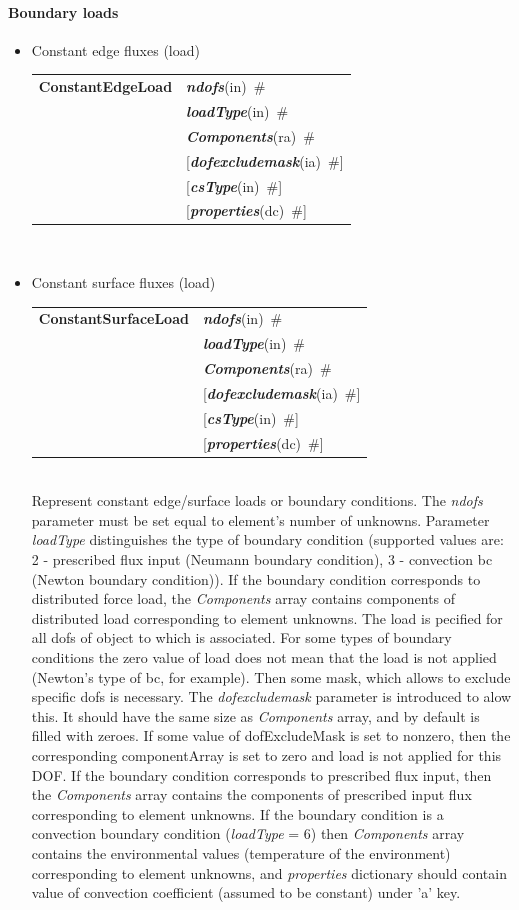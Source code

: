 \documentclass[a4paper]{article}
\makeatletter
\newcommand{\param}[1]{{\em #1}}
\newcommand{\keywordnotype}[1]{\mbox{{\it{\bf{#1}}}}}
\newcommand{\keyword}[2]{\mbox{{\keywordnotype{#1}\tiny (#2)}}}
\newcommand{\entKeywordInst}[1]{\mbox{{\bf{{#1}}}}}
\newcommand{\field}[2]{\mbox{\keyword{#1}{#2}~\#}}
\newcommand{\optField}[2]{\mbox{[\field{#1}{#2}]}}
\newenvironment{record}[1][]{\begin{tabular}{|ll}}{\end{tabular}\\}
\newcommand{\recentry}[2]{{#1}&{#2}\\}
\newcounter{rcc}
\newenvironment{record}[1][\textwidth]{\setcounter{rcc}{0}\begin{tabular*}{#1}{|ll@{\extracolsep{\fill}}r}}{\end{tabular*}\\}
\newcommand{\recentry}[2]{\ifthenelse{\value{rcc}>0}{&$\backslash$ \\}{\setcounter{rcc}{1}}{#1}&{#2}}
\makeatother
\begin{document}
\paragraph{Boundary loads}
\begin{itemize}
\item Constant edge fluxes (load)

  \begin{record}[0.9\textwidth]
    \recentry{\entKeywordInst{ConstantEdgeLoad}}{\field{ndofs}{in}} \recentry{}{\field{loadType}{in}}
    \recentry{}{\field{Components}{ra}} \recentry{}{\optField{dofexcludemask}{ia}} 
    \recentry{}{\optField{csType}{in}} \recentry{}{\optField{properties}{dc}}
  \end{record}
\item Constant surface fluxes (load)

  \begin{record}[0.9\textwidth]
    \recentry{\entKeywordInst{ConstantSurfaceLoad}}{\field{ndofs}{in}} \recentry{}{\field{loadType}{in}}
    \recentry{}{\field{Components}{ra}} \recentry{}{\optField{dofexcludemask}{ia}} 
    \recentry{}{\optField{csType}{in}} \recentry{}{\optField{properties}{dc}}
  \end{record}
  Represent constant edge/surface loads or boundary conditions. The \param{ndofs} parameter must be set
equal to element's number of unknowns. Parameter \param{loadType}
distinguishes the type of boundary condition (supported values are:
2 - prescribed flux input (Neumann boundary condition), 3 - convection bc (Newton boundary condition)). 
If the boundary condition corresponds to distributed force load, the
\param{Components} array contains components of distributed load
corresponding to element unknowns.
The load is pecified for all dofs of object to which is associated.
For some types of boundary conditions the zero value of load does not mean
that the load is not applied (Newton's type of bc, for example). Then 
some mask, which allows to exclude specific dofs is necessary. 
The \param{dofexcludemask} parameter is introduced to alow this.
It should have the same size as \param{Components} array, and by
default is filled with zeroes. If some value of dofExcludeMask is set
to nonzero, then the corresponding componentArray 
is set to zero and load is not applied for this DOF.
If the boundary condition corresponds to prescribed flux input, then 
the \param{Components} array contains the components of prescribed
input flux corresponding to element unknowns.
If the boundary condition is a convection boundary condition
(\param{loadType} = 6) then \param{Components} array contains the
environmental values (temperature of the environment) corresponding to
element unknowns, and \param{properties} dictionary should contain
value of convection coefficient (assumed to be constant) under 'a'
key.



\end{itemize}
\end{document}

